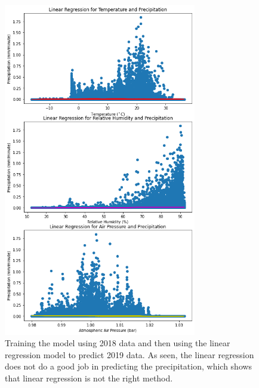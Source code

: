 \documentclass[11pt]{report}
\begin{document}
\begin{figure}[t]
  \centering
  \includegraphics[width=0.75\textwidth]{Figures/ML_Linear_reg.png}
  \caption[ML linear regression run] {\label{ML_Linear}Training the model
    using 2018 data and then using the linear regression model to predict
    2019 data. As seen, the linear regression does not do a good job in
    predicting the precipitation, which shows that linear regression is not
    the right method. }
\end{figure}
\end{document}
